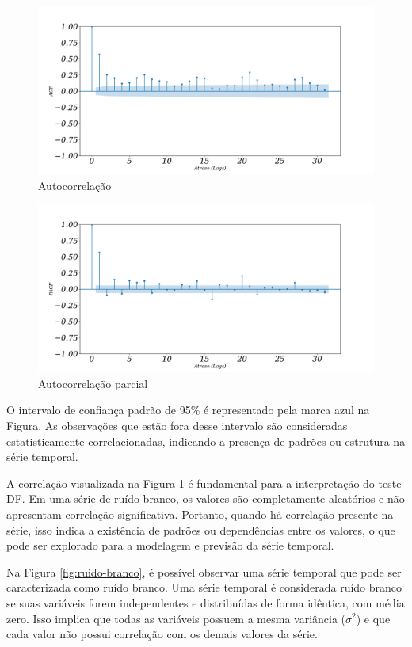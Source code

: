 \begin{figure}[!htb]
	\centering
	\caption{Autocorrelação}\label{fig:acfa}
	\includegraphics[width=0.9\linewidth]{Resultados/Figuras/acf} 
	

\end{figure}


\begin{figure}[!htb]
	\centering
	\caption{Autocorrelação parcial}\label{fig:pacf}
	\includegraphics[width=0.9\linewidth]{Resultados/Figuras/pacf}
		
		

\end{figure}

O intervalo de confiança padrão de 95\% é representado pela marca azul na Figura. As observações que estão fora desse intervalo são consideradas estatisticamente correlacionadas, indicando a presença de padrões ou estrutura na série temporal.

A correlação visualizada na Figura \ref{fig:acfa} é fundamental para a interpretação do teste DF. Em uma série de ruído branco, os valores são completamente aleatórios e não apresentam correlação significativa. Portanto, quando há correlação presente na série, isso indica a existência de padrões ou dependências entre os valores, o que pode ser explorado para a modelagem e previsão da série temporal.


Na Figura \ref{fig:ruido-branco}, é possível observar uma série temporal que pode ser caracterizada como ruído branco. Uma série temporal é considerada ruído branco se suas variáveis forem independentes e distribuídas de forma idêntica, com média zero. Isso implica que todas as variáveis possuem a mesma variância ($\sigma^2$) e que cada valor não possui correlação com os demais valores da série.


